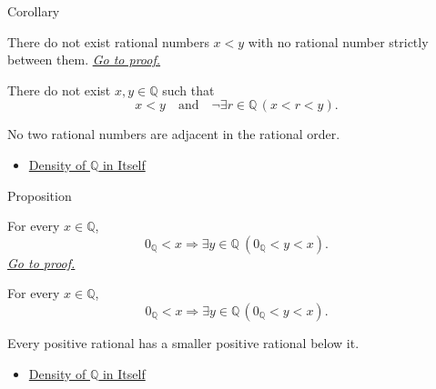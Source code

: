 \begin{corollarybox}{Corollary}
\begin{corollary}
\label{cor:q-has-no-adjacent-points}
There do not exist rational numbers $x<y$ with no rational number strictly
between them.
\hyperref[prf:q-has-no-adjacent-points]{\textit{Go to proof.}}
\end{corollary}
\end{corollarybox}

\begin{remark*}
There do not exist $x,y\in\mathbb{Q}$ such that
\[
x<y
\quad\text{and}\quad
\neg\exists r\in\mathbb{Q}\,(x<r<y).
\]
\end{remark*}

\begin{remark*}[Interpretation]
No two rational numbers are adjacent in the rational order.
\end{remark*}

\begin{dependencies}
\begin{itemize}
  \item \hyperref[thm:density-of-q]{Density of $\mathbb{Q}$ in Itself}
\end{itemize}
\end{dependencies}

\begin{propositionbox}{Proposition}
\begin{proposition}
\label{prop:no-least-positive-rational}
For every $x\in\mathbb{Q}$,
\[
0_{\mathbb{Q}}<x
\Longrightarrow
\exists y\in\mathbb{Q}\ (0_{\mathbb{Q}}<y<x).
\]
\hyperref[prf:no-least-positive-rational]{\textit{Go to proof.}}
\end{proposition}
\end{propositionbox}

\begin{remark*}
For every $x\in\mathbb{Q}$,
\[
0_{\mathbb{Q}}<x
\Longrightarrow
\exists y\in\mathbb{Q}\,(0_{\mathbb{Q}}<y<x).
\]
\end{remark*}

\begin{remark*}[Interpretation]
Every positive rational has a smaller positive rational below it.
\end{remark*}

\begin{dependencies}
\begin{itemize}
  \item \hyperref[thm:density-of-q]{Density of $\mathbb{Q}$ in Itself}
\end{itemize}
\end{dependencies}

